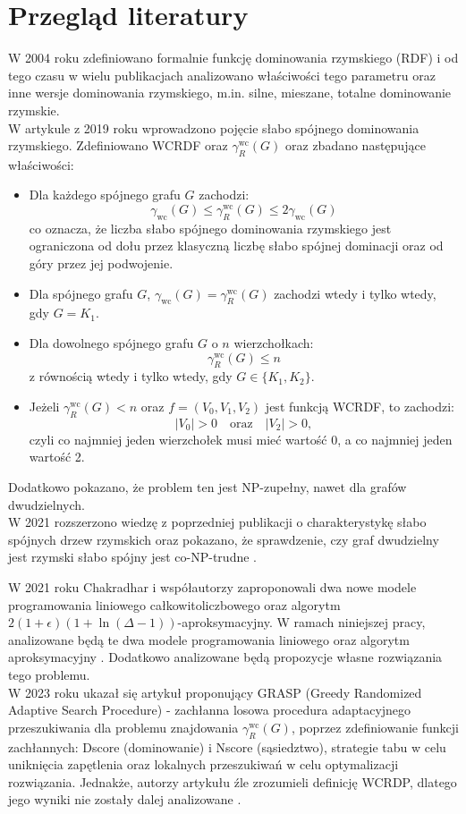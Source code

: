 \section{Przegląd literatury}
W 2004 roku zdefiniowano formalnie funkcję dominowania rzymskiego (RDF) \cite{RDF} i od tego czasu w wielu publikacjach analizowano właściwości tego parametru oraz inne wersje dominowania rzymskiego, m.in. silne, mieszane, totalne dominowanie rzymskie.\\ 
W artykule z 2019 roku \cite{theoryWCRDF} wprowadzono pojęcie słabo spójnego dominowania rzymskiego. Zdefiniowano WCRDF oraz $\gamma_{R}^{\text{wc}}(G)$ oraz zbadano następujące właściwości:
\begin{itemize}
    \item Dla każdego spójnego grafu $G$ zachodzi:
    \[
    \gamma_{\text{wc}}(G) \leq \gamma_{R}^{\text{wc}}(G) \leq 2\gamma_{\text{wc}}(G)
    \]
    co oznacza, że liczba słabo spójnego dominowania rzymskiego jest ograniczona od dołu przez klasyczną liczbę słabo spójnej dominacji oraz od góry przez jej podwojenie.

    \item Dla spójnego grafu $G$, $\gamma_{\text{wc}}(G) = \gamma_{R}^{\text{wc}}(G)$ zachodzi wtedy i tylko wtedy, gdy $G = K_1$.

    \item Dla dowolnego spójnego grafu $G$ o $n$ wierzchołkach:
    \[
    \gamma_{R}^{\text{wc}}(G) \leq n
    \]
    z równością wtedy i tylko wtedy, gdy $G \in \{K_1, K_2\}$.

    \item Jeżeli $\gamma_{R}^{\text{wc}}(G) < n$ oraz $f = (V_0, V_1, V_2)$ jest funkcją WCRDF, to zachodzi:
    \[
    |V_0| > 0 \quad \text{oraz} \quad |V_2| > 0,
    \] 
    czyli co najmniej jeden wierzchołek musi mieć wartość 0, a co najmniej jeden wartość 2.
\end{itemize}
Dodatkowo pokazano, że problem ten jest NP-zupełny, nawet dla grafów dwudzielnych.\\
W 2021 rozszerzono wiedzę z poprzedniej publikacji o charakterystykę słabo spójnych drzew rzymskich oraz pokazano, że sprawdzenie, czy graf dwudzielny jest rzymski słabo spójny jest co-NP-trudne \cite{PROGRESS}.

W 2021 roku Chakradhar i współautorzy zaproponowali dwa nowe modele programowania liniowego całkowitoliczbowego oraz algorytm $2(1+\epsilon)(1 + \ln(\Delta - 1))$-aproksymacyjny. W ramach niniejszej pracy, analizowane będą te dwa modele programowania liniowego oraz algorytm aproksymacyjny \cite{ILP}. Dodatkowo analizowane będą propozycje własne rozwiązania tego problemu.\\
W 2023 roku ukazał się artykuł proponujący GRASP (Greedy Randomized Adaptive Search Procedure) - zachłanna losowa procedura adaptacyjnego przeszukiwania dla problemu znajdowania $\gamma_{R}^{\text{wc}}(G)$, poprzez zdefiniowanie funkcji zachłannych: Dscore (dominowanie) i Nscore (sąsiedztwo), strategie tabu w celu uniknięcia zapętlenia oraz lokalnych przeszukiwań w celu optymalizacji rozwiązania. Jednakże, autorzy artykułu źle zrozumieli definicję WCRDP, dlatego jego wyniki nie zostały dalej analizowane \cite{GRASP}.

